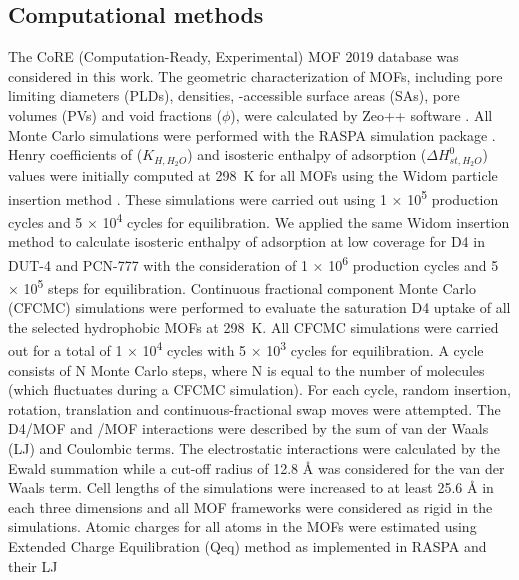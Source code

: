 \subsection{Computational methods}\label{methodology-computational}

The CoRE (Computation-Ready, Experimental) MOF 2019 database
\citep{chungAdvancesUpdatesAnalytics2019} was considered in this work. The
geometric characterization of MOFs, including pore limiting diameters (PLDs),
densities, -accessible surface areas (SAs), pore volumes (PVs) and void
fractions (\(\phi\)), were calculated by Zeo++ software
\citep{willemsAlgorithmsToolsHighthroughput2012}. All Monte Carlo simulations
were performed with the RASPA simulation package
\citep{dubbeldamRASPAMolecularSimulation2016}. Henry coefficients of 
(\(K_{H,H_{2}O}\)) and isosteric enthalpy of adsorption (\(\Delta
H_{st,H_{2}O}^{0}\)) values were initially computed at \SI{298}{\kelvin} for all
MOFs using the Widom particle insertion method
\citep{frenkelUnderstandingMolecularSimulation2002}. These simulations were
carried out using 1 × 10\textsuperscript{5} production cycles and 5 ×
10\textsuperscript{4} cycles for equilibration. We applied the same Widom
insertion method to calculate isosteric enthalpy of adsorption at low coverage
for D4 in DUT-4 and PCN-777 with the consideration of 1 × 10\textsuperscript{6}
production cycles and 5 × 10\textsuperscript{5} steps for equilibration.
Continuous fractional component Monte Carlo (CFCMC) simulations were performed
to evaluate the saturation D4 uptake of all the selected hydrophobic MOFs at
\SI{298}{\kelvin}. All CFCMC simulations were carried out for a total of 1 ×
10\textsuperscript{4} cycles with 5 × 10\textsuperscript{3} cycles for
equilibration. A cycle consists of N Monte Carlo steps, where N is equal to the
number of molecules (which fluctuates during a CFCMC simulation). For each
cycle, random insertion, rotation, translation and continuous-fractional swap
moves were attempted. The D4/MOF and /MOF interactions were described by
the sum of van der Waals (LJ) and Coulombic terms. The electrostatic
interactions were calculated by the Ewald summation
\citep{ewaldBerechnungOptischerUnd1921} while a cut-off radius of 12.8 Å was
considered for the van der Waals term. Cell lengths of the simulations were
increased to at least 25.6 Å in each three dimensions and all MOF frameworks
were considered as rigid in the simulations. Atomic charges for all atoms in the
MOFs were estimated using Extended Charge Equilibration (Qeq) method as
implemented in RASPA \citep{dubbeldamRASPAMolecularSimulation2016} and their LJ

